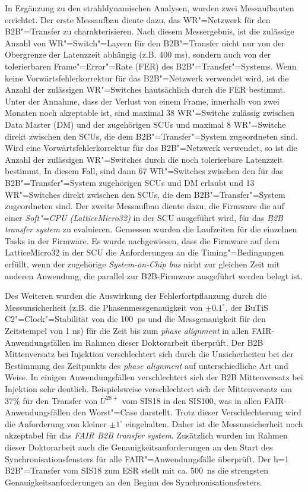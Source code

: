In Ergänzung zu den strahldynamischen Analysen, wurden zwei Messaufbauten errichtet. Der erste Messaufbau diente dazu, das WR"=Netzwerk f\"ur den B2B"=Transfer zu cha­rak­te­ri­sie­ren. Nach diesem Messergebnis, ist die zul\"assige Anzahl von WR"=Switch"=Layern f\"ur den B2B"=Transfer nicht nur von der Obergrenze der Latenzzeit abh\"angig (z.B. 400 ms), sondern auch von der tolerierbaren Frame"=Error"=Rate (FER) des B2B"=Transfer"=Systems. Wenn keine Vorw\"artsfehlerkorrektur f\"ur das B2B"=Netzwerk verwendet wird, ist die Anzahl der zul\"assigen WR"=Switches hauts\"achlich durch die FER bestimmt. Unter der Annahme, dass der Verlust von einem Frame, innerhalb von zwei Monaten noch akzeptable ist, sind maximal 38 WR"=Switche zul\"assig zwischen Data Master (DM) und der zugeh\"origen SCUs und maximal 8 WR"=Switche direkt zwischen den SCUs, die dem B2B"=Transfer"=System zugeordneten sind. Wird eine Vorw\"artsfehlerkorrektur f\"ur das B2B"=Netzwerk verwendet, so ist die Anzahl der zul\"assigen WR"=Switches durch die noch tolerierbare Latenzzeit bestimmt. In diesem Fall, sind dann 67 WR"=Switches zwischen den f\"ur das B2B"=Transfer"=System zugeh\"origen SCUs  und DM erlaubt und 13 WR"=Switches direkt zwischen den SCUs, die dem B2B"=Transfer"=System zugeordneten sind. Der zweite Messaufbau diente dazu, die Firmware die auf einer \textit{Soft"=CPU (LatticeMicro32)} in der SCU ausgef\"uhrt wird, f\"ur das \textit{B2B transfer system} zu evaluieren. Gemessen wurden die Laufzeiten für die einzelnen Tasks in der Firmware. Es wurde nachgewiesen, dass die Firmware auf dem LatticeMicro32 in der SCU die Anforderungen an die  Timing"=Bedingungen erfüllt, wenn der zugeh\"orige \textit{System-on-Chip bus} nicht zur gleichen Zeit mit anderen Anwendung, die parallel zur B2B-Firmware ausgef\"uhrt werden belegt ist.

Des Weiteren wurden die Auswirkung der Fehlerfortpflanzung durch die Messunsicherheit (z.B. die Phasenmessgenauigkeit von $\pm 0.1^\circ$, der BuTiS C2"=Clock"=Stabilit\"at von die \SI{100}{ps} und die Messgenauigkeit für den Zeitstempel von 1 ns) f\"ur die Zeit bis zum \textit{phase alignment} in allen FAIR-Anwendungsf\"allen im Rahmen dieser Doktorarbeit überpr\"uft. Der B2B Mittenversatz bei Injektion verschlechtert sich durch die Unsicherheiten bei der Bestimmung des Zeitpunkts des \textit{phase alignment} auf unterschiedliche Art und Weise. In einigen Anwendungsfällen verschlechtert sich der B2B Mittenversatz bei Injektion sehr deutlich. Beispielsweise verschlechtert sich der Mittenversatz um $37\%$ f\"ur den Transfer von $U^\mathit{28+}$  vom SIS18 in den SIS100, was in allen FAIR-Anwendungsf\"allen den Worst"=Case darstellt. Trotz dieser Verschlechterung wird die Anforderung von kleiner $\pm1^\circ$ eingehalten. Daher ist die Messunsicherheit noch akzeptabel für das \textit{FAIR B2B transfer system}. Zus\"atzlich wurden im Rahmen dieser Doktorarbeit auch die Genauigkeitsanforderungen an den Start des Synchronisationsfensters f\"ur alle FAIR"=Anwendungsf\"alle \"uberpr\"uft. Der h=1 B2B"=Transfer vom SIS18 zum ESR stellt mit ca. \SI{500}{\ns} die strengsten Genauigkeitsanforderungen an den Beginn des Synchronisationsfesters. 

